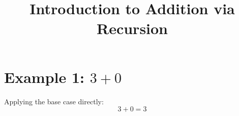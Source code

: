 \documentclass{article}
\title{Introduction to Addition via Recursion}
\author{}
\date{}
\begin{document}
\section{Example 1: \( 3 + 0 \)}

Applying the base case directly:
\[
    3 + 0 = 3
\]
\end{document}
